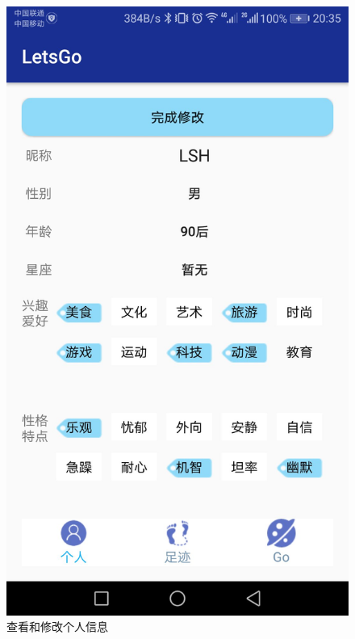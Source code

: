 \documentclass[UTF8]{article}
\begin{document}
\begin{figure}[H]
\begin{minipage}[t]{0.33\textwidth}
    \includegraphics[width=\textwidth]{images/demo_profile.jpeg}
    \caption{查看和修改个人信息}
\end{minipage}
\end{figure}
\end{document}
